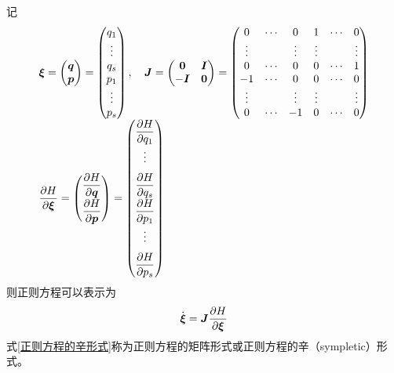 记
\begin{equation*}
	\begin{array}{l}
	\displaystyle \boldsymbol{\xi} = \begin{pmatrix} \boldsymbol{q} \\ \boldsymbol{p} \end{pmatrix} = \begin{pmatrix} q_1 \\ \vdots \\ q_s \\ p_1 \\ \vdots \\ p_s \end{pmatrix},\quad \boldsymbol{J} = \begin{pmatrix} \boldsymbol{0} & \boldsymbol{I} \\ -\boldsymbol{I} & \boldsymbol{0} \end{pmatrix} = \begin{pmatrix} 0 & \cdots & 0 & 1 & \cdots & 0 \\ \vdots & & \vdots & \vdots & & \vdots \\ 0 & \cdots & 0 & 0 & \cdots & 1 \\ -1 & \cdots & 0 & 0 & \cdots & 0 \\ \vdots & & \vdots & \vdots & & \vdots \\ 0 & \cdots & -1 & 0 & \cdots & 0 \end{pmatrix} \\
	\displaystyle \frac{\partial H}{\partial \boldsymbol{\xi}} = \begin{pmatrix} \dfrac{\partial H}{\partial \boldsymbol{q}} \\[1.5ex] \dfrac{\partial H}{\partial \boldsymbol{p}} \end{pmatrix} = \begin{pmatrix} \dfrac{\partial H}{\partial q_1} \\[1.5ex] \vdots \\[1.5ex] \dfrac{\partial H}{\partial q_s} \\[1.5ex] \dfrac{\partial H}{\partial p_1} \\[1.5ex] \vdots \\[1.5ex] \dfrac{\partial H}{\partial p_s} \end{pmatrix}
	\end{array}
\end{equation*}
则正则方程可以表示为
\begin{equation}
	\dot{\boldsymbol{\xi}} = \boldsymbol{J} \frac{\partial H}{\partial \boldsymbol{\xi}}
	\label{正则方程的辛形式}
\end{equation}
式\eqref{正则方程的辛形式}称为{\heiti 正则方程的矩阵形式}或{\heiti 正则方程的辛（sympletic）形式}。

